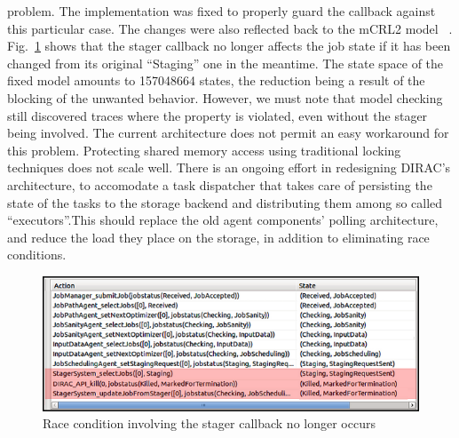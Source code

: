 \documentclass[sort&compress,preprint,3p]{elsarticle}
\begin{document}
problem. The implementation was fixed to properly guard the callback against this particular case.
The changes were also reflected back to the mCRL2 model ~\cite{svn_mcrl2}. Fig.~\ref{fig:zombieJobFix}
shows that the stager callback no longer affects the job state if it has been changed from its
original ``Staging'' one in the meantime. 
The state space of the fixed model amounts to 
157048664 states, the reduction being a result of the blocking of the unwanted behavior.
However, we must note that model checking still discovered traces where the property 
is violated, even without the stager being involved.
The current architecture does not permit an easy workaround for this problem.
Protecting shared memory access using traditional locking techniques does not scale well.
There is an ongoing effort in redesigning DIRAC's architecture, to accomodate
a task dispatcher that takes care of persisting the state of the tasks to the storage 
backend and distributing them among so called ``executors''.This should 
replace the old agent components' polling architecture, and reduce the load
they place on the storage, in addition to eliminating race conditions.

\begin{figure}[tp]
\includegraphics[width=0.6\linewidth,keepaspectratio=true]{./graphics/Figure12.png}
\centering
\caption{ Race condition involving the stager callback no longer occurs}
\label{fig:zombieJobFix}
\end{figure}%
  
\end{document}
